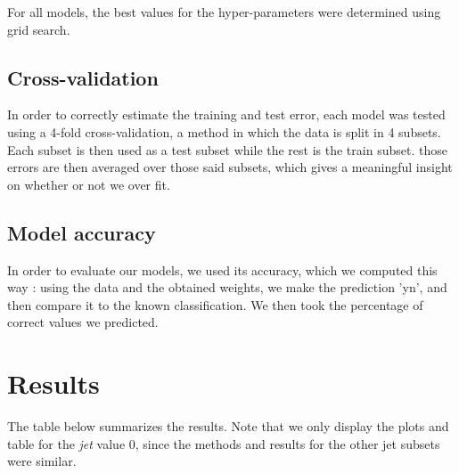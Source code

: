 \documentclass[a4paper]{article}
\begin{document}
\begin{multicols*}{2}
For all models, the best values for the hyper-parameters were determined using grid search.

\subsection{Cross-validation}
In order to correctly estimate the training and test error, each model was tested using a 4-fold cross-validation, a method in which the data is split in 4 subsets. Each subset is then used as a test subset while the rest is the train subset. those errors are then averaged over those said subsets, which gives a meaningful insight on whether or not we over fit.

\subsection{Model accuracy}
In order to evaluate our models, we used its accuracy, which we computed this way : using the data and the obtained weights, we make the prediction 'yn', and then compare it to the known classification. We then took the percentage of correct values we predicted.

\end{multicols*}
\newpage

\section{Results}
The table below summarizes the results. Note that we only display the plots and table for the \textit{jet} value 0, since the methods and results for the other jet subsets were similar.
\end{document}
